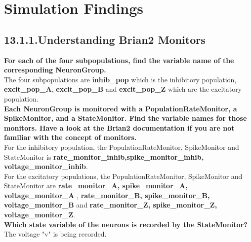 \section*{Simulation Findings}

\subsection*{13.1.1.Understanding Brian2 Monitors}

\textbf{For each of the four subpopulations, find the variable name of the corresponding NeuronGroup.} \\

The four subpopulations are \textbf{inhib\_pop} which is the inhibitory population, \textbf{excit\_pop\_A}, \textbf{excit\_pop\_B} and \textbf{excit\_pop\_Z} which are the excitatory population. \\

\textbf{Each NeuronGroup is monitored with a PopulationRateMonitor, a SpikeMonitor, and a StateMonitor. Find the variable names for those monitors. Have a look at the Brian2 documentation if you are not familiar with the concept of monitors.}\\

For the inhibitory population, the PopulationRateMonitor, SpikeMonitor and StateMonitor is \textbf{rate\_monitor\_inhib,spike\_monitor\_inhib, voltage\_monitor\_inhib}.\\
For the excitatory populations, the PopulationRateMonitor, SpikeMonitor and StateMonitor are \textbf{rate\_monitor\_A, spike\_monitor\_A, voltage\_monitor\_A} ,  \textbf{rate\_monitor\_B, spike\_monitor\_B, voltage\_monitor\_B} and \textbf{rate\_monitor\_Z, spike\_monitor\_Z, voltage\_monitor\_Z}.\\

\textbf{Which state variable of the neurons is recorded by the StateMonitor?}\\

The voltage "v" is being recorded.


